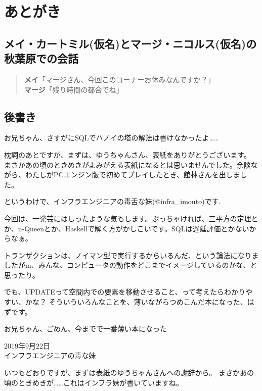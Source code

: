 \chapter{あとがき}

\section*{メイ・カートミル(仮名)とマージ・ニコルス(仮名)の秋葉原での会話}

\begin{quotation}
\noindent
{\bf メイ}「マージさん、今回このコーナーお休みなんですか？」　\\
{\bf マージ}「残り時間の都合でね」 \\
\end{quotation}


\section*{後書き}

お兄ちゃん、さすがにSQLでハノイの塔の解法は書けなかったよ……

枕詞のあとですが、まずは、ゆうちゃんさん、表紙をありがとうございます。
まさかあの頃のときめきがよみがえる表紙になるとは思いませんでした。余談ながら、わたしがPCエンジン版で初めてプレイしたとき、館林さんを出しました。

というわけで、インフラエンジニアの毒舌な妹(@infra\_imouto)です.

今回は、一発芸にはしったような気もします。ぶっちゃければ、三平方の定理とか、n-Queenとか、Haskellで解く方がかしこいです。SQLは遅延評価とかないからなぁ。

トランザクションは、ノイマン型で実行するからいるんだ、という論法になりましたがm、みんな、コンピュータの動作をどこまでイメージしているのかな、と思ったり。

でも、UPDATEって空間内での要素を移動させること、って考えたらわかりやすい、かな？
そういういろんなことを、薄いながらつめこんだ本になった、はずです。

お兄ちゃん、ごめん、今までで一番薄い本になった

\begin{flushright}
2019年9月22日 \\
インフラエンジニアの毒な妹 \\
\end{flushright}

いつもどおりですが、まずは表紙のゆうちゃんさんへの謝辞から。
まさかあの頃のときめきが……これはインフラ妹が書いていますね。

